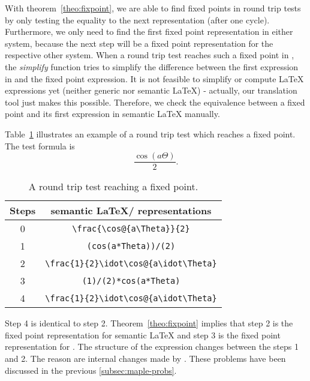 With theorem~\ref{theo:fixpoint}, we are able to find fixed points in round trip tests by only testing the equality to the next representation (after one cycle). Furthermore, we only need to find the first fixed point representation in either system, because the next step will be a fixed point representation for the respective other system. When a round trip test reaches such a fixed point in \Maple, the \textit{simplify} function tries to simplify the difference between the first expression in \Maple{} and the fixed point expression. It is not feasible to simplify or compute \LaTeX{} expressions yet (neither generic nor semantic \LaTeX) - actually, our translation tool just makes this possible. Therefore, we check the equivalence between a fixed point and its first expression in semantic \LaTeX{} manually.

Table~\ref{tab:fixpoint} illustrates an example of a round trip test which reaches a fixed point. The test formula is
\begin{equation}
\frac{\cos\left(a\Theta\right)}{2}.
\end{equation}

\begin{table}[ht]
\centering
\begin{tabular}{cc}
	\hline 
	Steps & semantic \LaTeX{}/\Maple{} representations\\
	\hline
	\rule{0pt}{0.9\normalbaselineskip}0 & \verb|\frac{\cos@{a\Theta}}{2}|\\
	1 & \verb|(cos(a*Theta))/(2)| \\
	2 & \verb|\frac{1}{2}\idot\cos@{a\idot\Theta}| \\
	3 & \verb|(1)/(2)*cos(a*Theta)|\\
	4 & \verb|\frac{1}{2}\idot\cos@{a\idot\Theta}| \\
	\hline
\end{tabular}
\caption{A round trip test reaching a fixed point.}
\label{tab:fixpoint}
\end{table}

Step 4 is identical to step 2. Theorem~\ref{theo:fixpoint} implies that step 2 is the fixed point representation for semantic \LaTeX{} and step 3 is the fixed point representation for \Maple. The structure of the expression changes between the steps 1 and 2. The reason are internal changes made by \Maple. These problems have been discussed in the previous \cref{subsec:maple-probs}.

